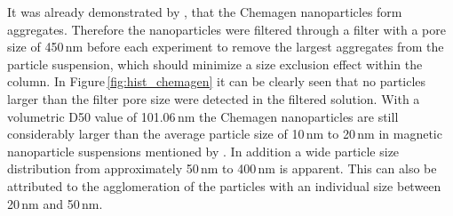 It was already demonstrated by \cite{AndreMaster}, that the Chemagen nanoparticles form aggregates. Therefore the nanoparticles were filtered through a filter with a pore size of 450\,nm before each experiment to remove the largest aggregates from the particle suspension, which should minimize a size exclusion effect within the column. In Figure\,\ref{fig:hist_chemagen} it can be clearly seen that no particles larger than the filter pore size were detected in the filtered solution. With a volumetric D50 value of 101.06\,nm the Chemagen nanoparticles are still considerably larger than the average particle size of 10\,nm to 20\,nm in magnetic nanoparticle suspensions mentioned by \cite{svoboda2004magnetic}. In addition a wide particle size distribution from approximately 50\,nm to 400\,nm is apparent. This can also be attributed to the agglomeration of the particles with an individual size between 20\,nm and 50\,nm.
